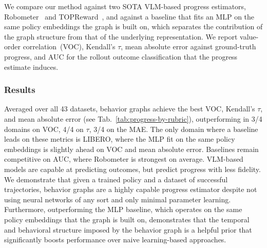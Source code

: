 \documentclass[letterpaper, 10 pt, conference]{ieeeconf}
\begin{document}
We compare our method against two SOTA VLM-based progress estimators, Robometer~\cite{liang_robometer_2026} and TOPReward~\cite{chen_topreward_2026}, and against a baseline that fits an MLP on the same policy embeddings the graph is built on, which separates the contribution of the graph structure from that of the underlying representation. We report value-order correlation~(VOC), Kendall's $\tau$, mean absolute error against ground-truth progress, and AUC for the rollout outcome classification that the progress estimate induces.

\subsubsection{Results}

Averaged over all 43 datasets, behavior graphs achieve the best VOC, Kendall's $\tau$, and mean absolute error (see Tab.~\ref{tab:progress-by-rubric}), outperforming in 3/4 domains on VOC, 4/4 on $\tau$, 3/4 on the MAE. The only domain where a baseline leads on these metrics is LIBERO, where the MLP fit on the same policy embeddings is slightly ahead on VOC and mean absolute error. Baselines remain competitive on AUC, where Robometer is strongest on average. VLM-based models are capable at predicting outcomes, but predict progress with less fidelity. We demonstrate that given a trained policy and a dataset of successful trajectories, behavior graphs are a highly capable progress estimator despite not using neural networks of any sort and only minimal parameter learning. Furthermore, outperforming the MLP baseline, which operates on the same policy embeddings that the graph is built on, demonstrates that the temporal and behavioral structure imposed by the behavior graph is a helpful prior that significantly boosts performance over naive learning-based approaches.
\end{document}
